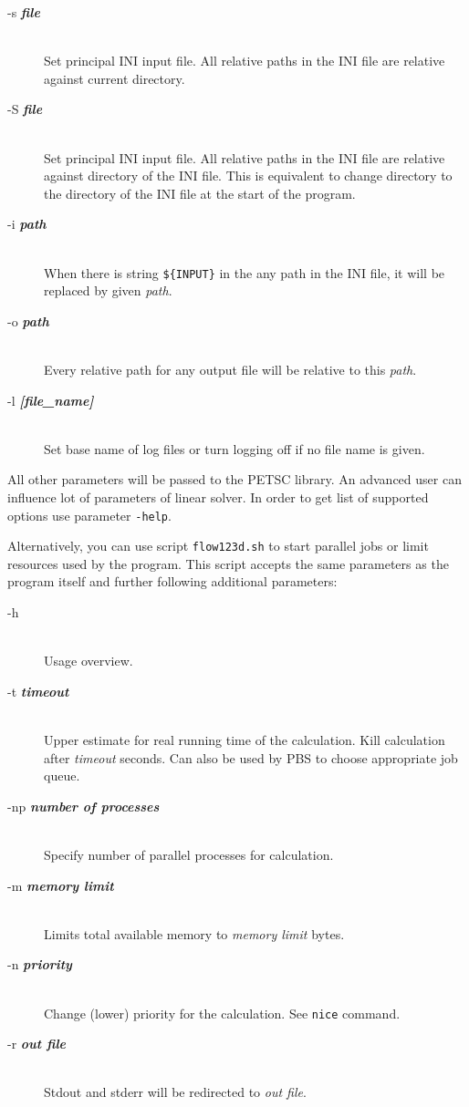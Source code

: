 \documentclass[12pt,a4paper]{report}
\begin{document}
\begin{description}
 \item[-s {\bf\it file}] \hfill\\
 	 Set principal INI input file. All relative paths in the INI file are relative against current directory.
 \item[-S {\bf\it file}] \hfill\\
 	Set principal INI input file. All relative paths in the INI file are relative against directory of the INI file. This is equivalent
to change directory to the directory of the INI file at the start of the program.
 \item[-i {\bf\it path}] \hfill\\
 	When there is string \verb"${INPUT}" %
  	in the any path in the INI file, it will be replaced by given {\it path}.
 \item[-o {\bf\it path}] \hfill\\
 	Every relative path for any output file will be relative to this {\it path}. 
 \item[-l {\bf\it [file\_name]}] \hfill\\
 	Set base name of log files or turn logging off if no file name is given.

\end{description}

All other parameters will be passed to the PETSC library. An advanced user can influence lot of parameters of linear solver. In order to get list of supported options 
use parameter \verb'-help'.


Alternatively, you can use script \verb'flow123d.sh' to start parallel jobs or limit resources used by the program. This script accepts the same parameters as the program itself
and further following additional parameters:

\begin{description}
  \item[-h] \hfill\\
  	Usage overview.
  \item[-t {\bf\it timeout}] \hfill\\
  	Upper estimate for real running time of the calculation. Kill calculation after {\it timeout} seconds. 
  	Can also be used by PBS to choose appropriate job queue. 
  \item[-np {\bf\it number of processes}] \hfill\\
  	Specify number of parallel processes for calculation.
  \item[-m {\bf\it memory limit}] \hfill\\
  	Limits total available memory to {\it memory limit} bytes.
  \item[-n {\bf\it priority}] \hfill\\
  	Change (lower) priority for the calculation. See {\tt nice} command.
  \item[-r {\bf\it out file}] \hfill\\
  	Stdout and stderr will be redirected to {\it out file}.
\end{description}
\end{document}
